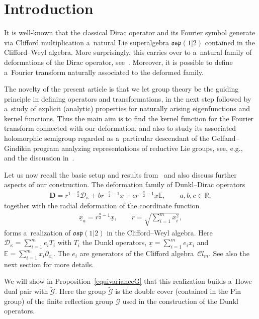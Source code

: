 \documentclass[pdftex]{sigma}
\numberwithin{equation}{section}
\numberwithin{theorem}{section}
\numberwithin{proposition}{section}
\numberwithin{lemma}{section}
\numberwithin{corollary}{section}
\numberwithin{definition}{section}
\numberwithin{example}{section}
\numberwithin{remark}{section}
\numberwithin{note}{section}
\theoremstyle{remark}
\newcommand{\mR}{\mathbb{R}}
\newcommand{\mE}{\mathbb{E}}
\newcommand{\cD}{\mathcal{D}}
\newcommand{\cC}{\mathcal{C}}
\newcommand{\cG}{\mathcal{G}}
\newcommand{\dD}{\textbf{D}}
\newcommand{\ux}{\underline{x}}
\def\k{{\kappa}}
\begin{document}
\section{Introduction}
\label{intro}

It is well-known that the classical Dirac operator and its Fourier symbol generate via Clif\/ford
multiplication a~natural Lie superalgebra $\mathfrak{osp}(1|2)$ contained in the Clif\/ford--Weyl
algebra.
More surprisingly, this carries over to a~natural family of deformations
of the Dirac operator, see~\cite{H12}.
Moreover, it is possible to def\/ine a~Fourier transform naturally associated to the deformed family.

The novelty of the present article is that we let group theory be the
guiding principle in def\/ining operators and transformations,
in the next step followed by a~study of explicit (analytic) properties
for naturally arising eigenfunctions and kernel functions.
Thus the main aim is to f\/ind the kernel function for the Fourier transform connected with our
deformation, and also to study its associated holomorphic semigroup
regarded as a~particular descendant of the Gelfand--Gindikin program analyzing
representations of reductive Lie groups, see, e.g.,~\cite{Ol} and the discussion in~\cite{Orsted2}.

Let us now recall the basic setup and results from~\cite{H12}
and also discuss further aspects of our construction.
The deformation family of Dunkl--Dirac operators
\begin{gather*}%
\dD=r^{1-\frac{a}{2}}\cD_{\k}+b r^{-\frac{a}{2}-1}\ux+c r^{-\frac{a}{2}-1}\ux\mE,\qquad a,b,c\in\mR,
\end{gather*}
together with the radial deformation of the coordinate function
\begin{gather*}
\ux_{a}=r^{\frac{a}{2}-1}\ux,\qquad r=\sqrt{\sum_{i=1}^{m}x_{i}^{2}},
\end{gather*}
forms a~realization of $\mathfrak{osp}(1|2)$ in the Clif\/ford--Weyl algebra.
Here $\cD_{\k}=\sum\limits_{i=1}^{m}e_{i}T_{i}$ with $T_{i}$ the Dunkl operators, $\ux=
\sum\limits_{i=1}^{m}e_{i}x_{i}$ and $\mE=\sum\limits_{i=1}^{m}x_{i}\partial_{x_{i}}$.
The $e_{i}$ are generators of the Clif\/ford algebra~$\cC l_{m}$.
See also the next section for more details.

We will show in Proposition~\ref{equivarianceG} that this realization builds a~Howe dual pair with
$\widetilde{\cG}$. Here the group $\widetilde{\cG}$ is the double cover (contained in the Pin
group) of the f\/inite ref\/lection group $\cG$ used in the construction of the Dunkl operators.
\end{document}
